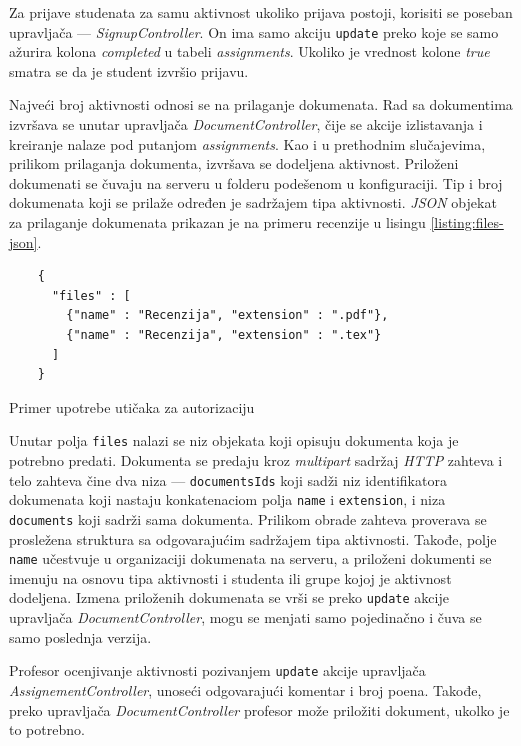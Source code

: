 \documentclass[12pt,oneside]{memoir}
\begin{document}
Za prijave studenata za samu aktivnost ukoliko prijava postoji, korisiti se poseban upravljača --- \emph{SignupController}.
On ima samo akciju \texttt{update} preko koje se samo ažurira kolona \emph{completed} u tabeli \emph{assignments}.
Ukoliko je vrednost kolone \emph{true} smatra se da je student izvršio prijavu.

Najveći broj aktivnosti odnosi se na prilaganje dokumenata. Rad sa dokumentima izvršava se unutar upravljača \emph{DocumentController},
čije se akcije izlistavanja i kreiranje nalaze pod putanjom \emph{assignments}. Kao i u prethodnim slučajevima, prilikom prilaganja dokumenta,
izvršava se dodeljena aktivnost. Priloženi dokumenati se čuvaju na serveru u folderu podešenom u konfiguraciji.
Tip i broj dokumenata koji se prilaže određen je sadržajem tipa aktivnosti. \emph{JSON} objekat za prilaganje dokumenata prikazan je
na primeru recenzije u lisingu \ref{listing:files-json}. 
\begin{listing}[h!]
\begin{verbatim}
    {
      "files" : [
        {"name" : "Recenzija", "extension" : ".pdf"},
        {"name" : "Recenzija", "extension" : ".tex"}
      ]
    }
\end{verbatim}
\caption{Primer upotrebe utičaka za autorizaciju}
\label{listing:files-json}
\end{listing}
Unutar polja \texttt{files} nalazi se niz objekata koji opisuju dokumenta koja je potrebno predati.
Dokumenta se predaju kroz \emph{multipart} sadržaj \emph{HTTP} zahteva i telo zahteva čine dva niza ---
\texttt{documentsIds} koji sadži niz identifikatora dokumenata koji nastaju konkatenaciom polja
\texttt{name} i \texttt{extension}, i niza \texttt{documents} koji sadrži sama dokumenta.
Prilikom obrade zahteva proverava se prosležena struktura sa odgovarajućim sadržajem tipa aktivnosti.
Takođe, polje \texttt{name} učestvuje u organizaciji dokumenata na serveru, a priloženi dokumenti se
imenuju na osnovu tipa aktivnosti i studenta ili grupe kojoj je aktivnost dodeljena.
Izmena priloženih dokumenata se vrši se preko \texttt{update} akcije upravljača \emph{DocumentController},
mogu se menjati samo pojedinačno i čuva se samo poslednja verzija.

Profesor ocenjivanje aktivnosti pozivanjem \texttt{update} akcije upravljača \emph{AssignementController},
unoseći odgovarajući komentar i broj poena. Takođe, preko upravljača \emph{DocumentController} profesor može
priložiti dokument, ukolko je to potrebno.  
\end{document}
